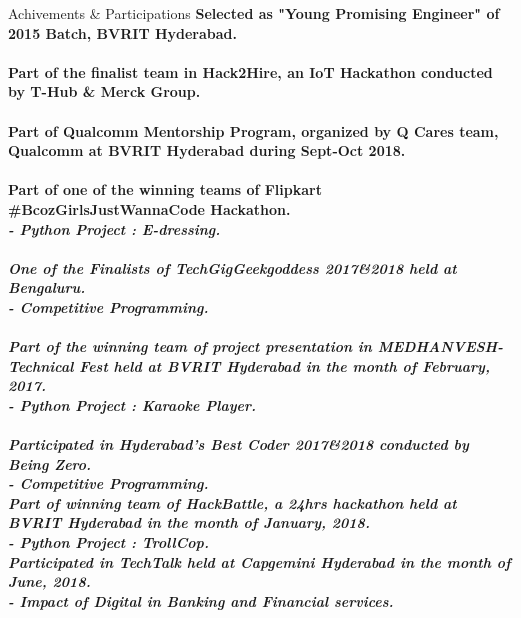 \documentclass{resume}
\begin{document}
\begin{rSection}{Achivements \& Participations}
\bf Selected as "Young Promising Engineer" of 2015 Batch, BVRIT Hyderabad.\\
\\
\bf Part of the finalist team in Hack2Hire, an IoT Hackathon conducted by T-Hub \& Merck Group.\\
\\
\bf Part of Qualcomm Mentorship Program, organized by Q Cares team, Qualcomm at BVRIT Hyderabad during Sept-Oct 2018.\\
\\
\bf Part of one of the winning teams of Flipkart \#BcozGirlsJustWannaCode Hackathon.\\
\sl - Python Project : E-dressing.\\
\\
\bf One of the Finalists of TechGigGeekgoddess 2017\&2018 held at Bengaluru.\\
\sl - Competitive Programming.\\
\\
\bf Part of the winning team of project presentation in MEDHANVESH-Technical Fest held at BVRIT Hyderabad in the month of February, 2017.\\
\sl - Python Project : Karaoke Player.\\
\\
\bf Participated in Hyderabad's Best Coder 2017\&2018 conducted by Being Zero.\\
\sl - Competitive Programming.\\

\bf Part of winning team of HackBattle, a 24hrs hackathon held at BVRIT Hyderabad in the month of January, 2018.\\
\sl - Python Project : TrollCop.\\

\bf Participated in TechTalk held at Capgemini Hyderabad in the month of June, 2018.\\
\sl - Impact of Digital in Banking and Financial services.\\

\end{rSection}
\pagebreak
\end{document}
